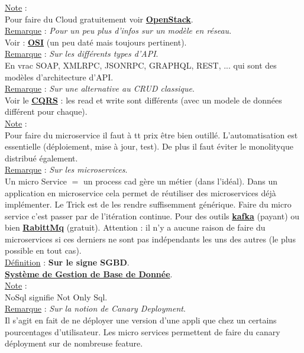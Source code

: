 \documentclass[a4paper,12pt,twoside]{article}
\newcommand{\urlcolor}{magenta}  %
\newcommand{\keycolor}{purple} %
\newcommand{\rem}[2]{\noindent\underline{Remarque} : \textit{#1}.\\ \indent #2}
\newcommand{\note}[1]{\noindent\underline{Note} : \\ \indent #1}
\newcommand{\defi}[2]{\noindent\underline{Définition} : \textbf{#1}.\\ \indent #2}
\newcommand{\keyref}[2]{\hypersetup{urlcolor=\keycolor} \href{#1}{\textbf{#2}}\hypersetup{urlcolor=\urlcolor}}
\begin{document}
\note{Pour faire du Cloud gratuitement voir \keyref{https://fr.wikipedia.org/wiki/OpenStack}{OpenStack}.}\\

\rem{Pour un peu plus d'infos sur un modèle en réseau}{Voir : \keyref{https://fr.wikipedia.org/wiki/Mod\%C3\%A8le\_OSI}{OSI} (un peu daté mais toujours pertinent).}\\

\rem{Sur les différents types d'API}{En vrac SOAP, XMLRPC, JSONRPC, GRAPHQL, REST, ... qui sont des modèles d'architecture d'API.}\\

\rem{Sur une alternative au CRUD classique}{Voir le \keyref{https://docs.microsoft.com/fr-fr/azure/architecture/patterns/cqrs}{CQRS} : les read et write sont différents (avec un modele de données différent pour chaque).}\\

\note{Pour faire du microservice il faut à tt prix être bien outillé. L'automatisation est essentielle (déploiement, mise à jour, test). De plus il faut éviter le monolityque distribué également.}\\

\rem{Sur les microservices}{Un micro Service $=$ un process cad gère un métier (dans l'idéal). Dans un application en microservice cela permet de réutiliser des microservices déjà implémenter. Le Trick est de les rendre suffisemment générique. Faire du micro service c'est passer par de l'itération continue. Pour des outils \keyref{https://developer.okta.com/blog/2020/01/22/kafka-microservices}{kafka} (payant) ou bien \keyref{https://www.rabbitmq.com/}{RabittMq} (gratuit). Attention : il n'y a aucune raison de faire du microservices si ces derniers ne sont pas indépendants les uns des autres (le plus possible en tout cas).}\\

\defi{Sur le signe SGBD}{\keyref{https://fr.wikipedia.org/wiki/Syst\%C3\%A8me\_de\_gestion\_de\_base\_de\_donn\%C3\%A9es}{Système de Gestion de Base de Donnée}.}\\

\note{NoSql signifie Not Only Sql.}\\

\rem{Sur la notion de Canary Deployment}{Il s'agit en fait de ne déployer une version d'une appli que chez un certains pourcentages d'utilisateur. Les micro services permettent de faire du canary déployment sur de nombreuse feature.}\\
\end{document}
